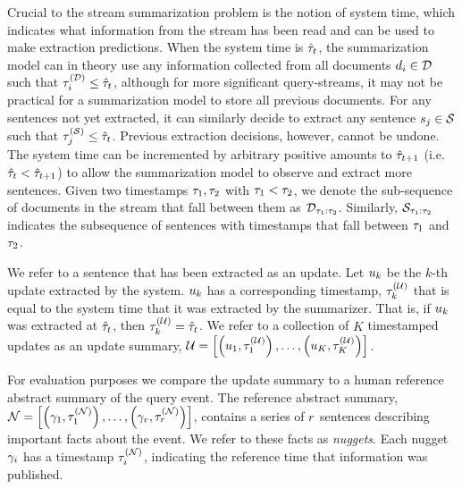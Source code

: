 Crucial to the stream summarization problem is the notion of system time, which
indicates what information from the stream has been read and can be used to
make extraction predictions. When the system time is $\hat{\tau}_t$, the
summarization model can in theory use any information collected from all
documents $d_i \in \mathcal{D}$ such that $\tau^{(\mathcal{D})}_i \le \hat{\tau}_t$, although
for more significant query-streams, it may not be practical for a summarization
model to store all previous documents. For any sentences not yet extracted, it
can similarly decide to extract any sentence $s_j \in \mathcal{S}$  such
that $\tau^{(\mathcal{S})}_j \le \hat{\tau}_t$. Previous extraction decisions, however, cannot
be undone. The system time can be incremented by arbitrary positive amounts to
$\hat{\tau}_{t+1}$ (i.e. $\hat{\tau}_t < \hat{\tau}_{t+1}$) to allow the summarization
model to observe and extract more sentences.  Given two timestamps
$\tau_1,\tau_2$ with $\tau_1 < \tau_2$, we denote the
sub-sequence of documents in the stream that fall between them as
$\mathcal{D}_{\tau_1:\tau_2}$. Similarly, $\mathcal{S}_{\tau_1:\tau_2}$ indicates
the subsequence of sentences with timestamps that fall between $\tau_1$ and
$\tau_2$.

We refer to a sentence that has been extracted as an update. Let $u_k$
be the $k$-th update extracted by the system.  $u_k$ has a corresponding
timestamp, $\tau^{(\mathcal{U})}_k$ that is equal to the system time that it was extracted by
the summarizer.  That is, if $u_k$ was extracted at $\hat{\tau}_t$, then
$\tau^{(\mathcal{U})}_k = \hat{\tau}_t$. We refer to a collection of $K$ timestamped updates as an
update summary, $\mathcal{U} = \left[ \left(u_1, \tau^{(\mathcal{U})}_1\right),
\ldots,\left(u_K, \tau^{(\mathcal{U})}_K\right) \right]$.

For evaluation purposes we compare the update summary to a human reference
abstract summary of the query event. The reference abstract summary, $\mathcal{N}
= \left[ \left(\gamma_1, \tau^{(\mathcal{N})}_1\right), \ldots, \left(\gamma_{r},
\tau^{(\mathcal{N})}_{r}\right) \right]$, contains a series of $r$ sentences describing
important facts about  the event. We refer to these facts as \textit{nuggets}.
Each nugget $\gamma_i$ has a timestamp $\tau^{(\mathcal{N})}_i$, indicating the reference
time that information was published.

